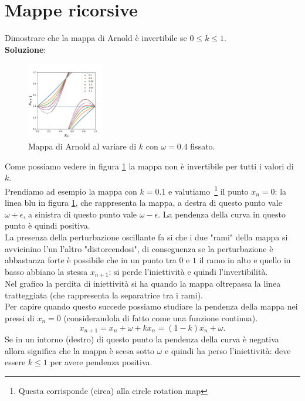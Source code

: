 \section{Mappe ricorsive}%
\begin{ex}
       Dimostrare che la mappa di Arnold è invertibile se $0\le k\le 1$.\\
       \textbf{Soluzione}:
       \begin{figure}[H]
           \centering
           \includegraphics[width=0.3\textwidth]{../figures/chap1/4_3_py.png}
	   \caption{\scriptsize Mappa di Arnold al variare di $k$ con $\omega  = 0.4$ fissato.}
           \label{fig:4_3_py-png}
       \end{figure}
       \noindent
       Come possiamo vedere in figura \ref{fig:4_3_py-png} la mappa non è invertibile per tutti i valori di $k$. \\
       Prendiamo ad esempio la mappa con $k=0.1$ e valutiamo\
       \footnote{Questa corrisponde (circa) alla circle rotation map} il punto $x_n=0$: la linea blu in figura \ref{fig:4_3_py-png}, che rappresenta la mappa, a destra di questo punto vale $\omega+\epsilon$, a sinistra di questo punto vale $\omega-\epsilon$. La pendenza della curva in questo punto è quindi positiva.\\
       La presenza della perturbazione oscillante fa si che i due "rami" della mappa si avvicinino l'un l'altro "distorcendosi", di conseguenza se la perturbazione è abbastanza forte è possibile che in un punto tra $0$ e $1$ il ramo in alto e quello in basso abbiano la stessa $x_{n+1}$: si perde l'iniettività e quindi l'invertibilità.\\
       Nel grafico la perdita di iniettività si ha quando la mappa oltrepassa la linea tratteggiata (che rappresenta la separatrice tra i rami).\\
       Per capire quando questo succede possiamo studiare la pendenza della mappa nei pressi di $x_n = 0$ (considerandola di fatto come una funzione continua).
       \[
	   x_{n+1} = x_n + \omega + k x_n = (1-k) x_n + \omega
       .\] 
       Se in un intorno (destro) di questo punto la pendenza della curva è negativa allora significa che la mappa è scesa sotto $\omega$ e quindi ha perso l'iniettività: deve essere $k\le 1$ per avere pendenza positiva.
\end{ex}
\noindent

